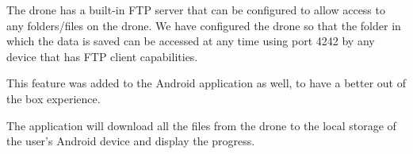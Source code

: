 The drone has a built-in FTP server that can be configured to allow access to any folders/files on the drone. We have configured the drone so that the folder in which the data is saved can be accessed at any time using port 4242 by any device that has FTP client capabilities. 

This feature was added to the Android application as well, to have a better out of the box experience.

The application will download all the files from the drone to the local storage of the user's Android device and display the progress.

